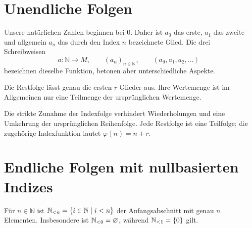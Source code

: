 \documentclass[main.tex]{subfiles}
\begin{document}
\section{Unendliche Folgen}


Unsere natürlichen Zahlen beginnen bei \(0\). Daher ist \(a_0\) das erste,
\(a_1\) das zweite und allgemein \(a_n\) das durch den Index \(n\)
bezeichnete Glied. Die drei Schreibweisen
\[
  a\colon\mathbb N\to M,
  \qquad (a_n)_{n\in\mathbb N},
  \qquad (a_0,a_1,a_2,\ldots)
\]
bezeichnen dieselbe Funktion, betonen aber unterschiedliche Aspekte.


Die Restfolge lässt genau die ersten \(r\) Glieder aus. Ihre Wertemenge ist
im Allgemeinen nur eine Teilmenge der ursprünglichen Wertemenge.


Die strikte Zunahme der Indexfolge verhindert Wiederholungen und eine
Umkehrung der ursprünglichen Reihenfolge. Jede Restfolge ist eine Teilfolge;
die zugehörige Indexfunktion lautet \(\varphi(n)=n+r\).

\section{Endliche Folgen mit nullbasierten Indizes}

Für \(n\in\mathbb N\) ist
\(\mathbb{N}_{<n}=\{i\in\mathbb N\mid i<n\}\) der Anfangsabschnitt mit genau
\(n\) Elementen. Insbesondere ist \(\mathbb{N}_{<0}=\varnothing\), während
\(\mathbb{N}_{<1}=\{0\}\) gilt.
\end{document}
